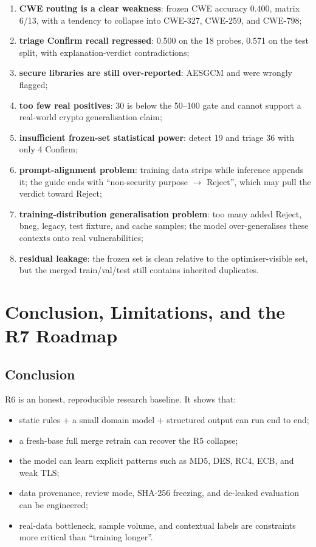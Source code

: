 \documentclass[11pt]{article}
\newcommand{\code}[1]{\texttt{\detokenize{#1}}}
\begin{document}
\begin{enumerate}
  \item \textbf{CWE routing is a clear weakness}: frozen CWE accuracy 0.400, matrix 6/13, with a tendency to
        collapse into CWE-327, CWE-259, and CWE-798;
  \item \textbf{triage Confirm recall regressed}: 0.500 on the 18 probes, 0.571 on the test split, with
        explanation-verdict contradictions;
  \item \textbf{secure libraries are still over-reported}: AESGCM and \code{nacl.SecretBox} were wrongly
        flagged;
  \item \textbf{too few real positives}: 30 is below the 50--100 gate and cannot support a real-world crypto
        generalisation claim;
  \item \textbf{insufficient frozen-set statistical power}: detect 19 and triage 36 with only 4 Confirm;
  \item \textbf{prompt-alignment problem}: training data strips \code{TRIAGE_PURPOSE_GUIDE} while inference
        appends it; the guide ends with ``non-security purpose $\rightarrow$ Reject'', which may pull the
        verdict toward Reject;
  \item \textbf{training-distribution generalisation problem}: too many added Reject, bneg, legacy, test
        fixture, and cache samples; the model over-generalises these contexts onto real vulnerabilities;
  \item \textbf{residual leakage}: the frozen set is clean relative to the optimiser-visible set, but the
        merged train/val/test still contains inherited duplicates.
\end{enumerate}

\section{Conclusion, Limitations, and the R7 Roadmap}

\subsection{Conclusion}

R6 is an honest, reproducible research baseline. It shows that:

\begin{itemize}
  \item static rules + a small domain model + structured output can run end to end;
  \item a fresh-base full merge retrain can recover the R5 collapse;
  \item the model can learn explicit patterns such as MD5, DES, RC4, ECB, and weak TLS;
  \item data provenance, review mode, SHA-256 freezing, and de-leaked evaluation can be engineered;
  \item real-data bottleneck, sample volume, and contextual labels are constraints more critical than
        ``training longer''.
\end{itemize}
\end{document}
